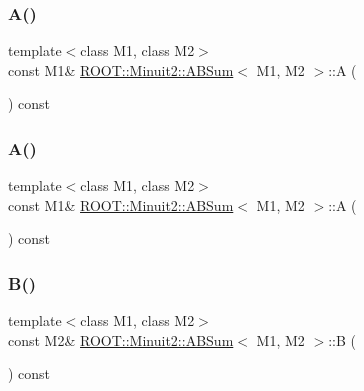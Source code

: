 \subsubsection{\texorpdfstring{A()}{A()}\hspace{0.1cm}{\footnotesize\ttfamily [2/3]}}
{\footnotesize\ttfamily template$<$class M1, class M2$>$ \\
const M1\& \mbox{\hyperlink{classROOT_1_1Minuit2_1_1ABSum}{R\+O\+O\+T\+::\+Minuit2\+::\+A\+B\+Sum}}$<$ M1, M2 $>$\+::A (\begin{DoxyParamCaption}{ }\end{DoxyParamCaption}) const\hspace{0.3cm}{\ttfamily [inline]}}

\mbox{\label{classROOT_1_1Minuit2_1_1ABSum_a079b47b55709bd81d820c277aa389b4f}} 
\subsubsection{\texorpdfstring{A()}{A()}\hspace{0.1cm}{\footnotesize\ttfamily [3/3]}}
{\footnotesize\ttfamily template$<$class M1, class M2$>$ \\
const M1\& \mbox{\hyperlink{classROOT_1_1Minuit2_1_1ABSum}{R\+O\+O\+T\+::\+Minuit2\+::\+A\+B\+Sum}}$<$ M1, M2 $>$\+::A (\begin{DoxyParamCaption}{ }\end{DoxyParamCaption}) const\hspace{0.3cm}{\ttfamily [inline]}}

\mbox{\label{classROOT_1_1Minuit2_1_1ABSum_a6370bd6e7593778d1933ef761dad2449}} 
\subsubsection{\texorpdfstring{B()}{B()}\hspace{0.1cm}{\footnotesize\ttfamily [1/3]}}
{\footnotesize\ttfamily template$<$class M1, class M2$>$ \\
const M2\& \mbox{\hyperlink{classROOT_1_1Minuit2_1_1ABSum}{R\+O\+O\+T\+::\+Minuit2\+::\+A\+B\+Sum}}$<$ M1, M2 $>$\+::B (\begin{DoxyParamCaption}{ }\end{DoxyParamCaption}) const\hspace{0.3cm}{\ttfamily [inline]}}

